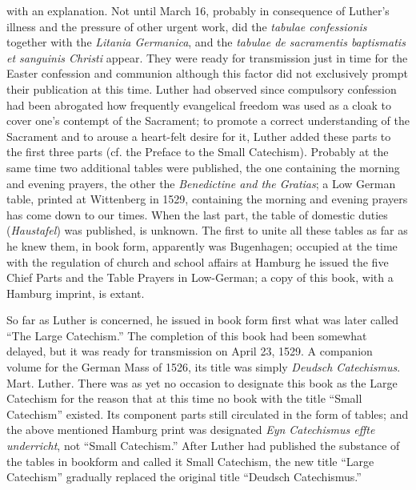 with an explanation. Not until March 16, probably in consequence of Luther’s illness and the pressure of other urgent work, did the \emph{tabulae confessionis} together with the \emph{Litania Germanica}, and the \emph{tabulae de sacramentis baptismatis et sanguinis Christi} appear. They were ready for transmission just in time for the Easter confession and communion although this factor did not exclusively prompt their publication at this time. Luther had observed since compulsory confession had been abrogated how frequently evangelical freedom was used as a cloak to cover one’s contempt of the Sacrament; to promote a correct understanding of the Sacrament and to arouse a heart-felt desire for it, Luther added these parts to the first three parts (cf. the Preface to the Small Catechism). Probably at the same time two additional tables were published, the one containing the morning and evening prayers, the other the \emph{Benedictine and the Gratias}; a Low German table, printed at Wittenberg in 1529, containing the morning and evening prayers has come down to our times. When the last part, the table of domestic duties (\emph{Haustafel}) was published, is unknown. The first to unite all these tables as far as he knew them, in book form, apparently was Bugenhagen; occupied at the time with the regulation of church and school affairs at Hamburg he issued the five Chief Parts and the Table Prayers in Low-German; a copy of this book, with a Hamburg imprint, is extant.

So far as Luther is concerned, he issued in book form first what was later called “The Large Catechism.” The completion of this book had been somewhat delayed, but it was ready for transmission on April 23, 1529. A companion volume for the German Mass of 1526, its title was simply \emph{Deudsch Catechismus}. Mart. Luther. There was as yet no occasion to designate this book as the Large Catechism for the reason that at this time no book with the title “Small Catechism” existed. Its component parts still circulated in
the form of tables; and the above mentioned Hamburg print was designated \emph{Eyn Catechismus effte underricht}, not “Small Catechism.” After Luther had published the substance of the tables in bookform and called it Small Catechism, the new title “Large Catechism” gradually replaced the original title “Deudsch Catechismus.”

